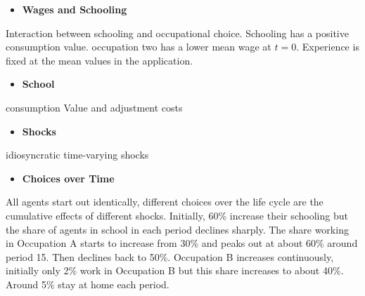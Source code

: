 \begin{itemize}\item[] \textbf{Wages and Schooling}\end{itemize}
Interaction between schooling and occupational choice. Schooling has a positive consumption value. occupation two has a lower mean wage at $t=0$. Experience is fixed at the mean values in the application.
\begin{itemize}\item[] \textbf{School}\end{itemize}
consumption Value and adjustment costs
\begin{itemize}\item[] \textbf{Shocks}\end{itemize}
idiosyncratic time-varying shocks
\begin{itemize}\item[] \textbf{Choices over Time}\end{itemize}
All agents start out identically, different choices over the life cycle are the cumulative effects of different shocks. Initially, 60\% increase their schooling but the share of agents in school in each period declines sharply. The share working in Occupation A starts to increase from 30\% and peaks out at about 60\% around period 15. Then declines back to 50\%. Occupation B increases continuously, initially only 2\% work in Occupation B but this share increases to about 40\%. Around 5\% stay at home each period.
